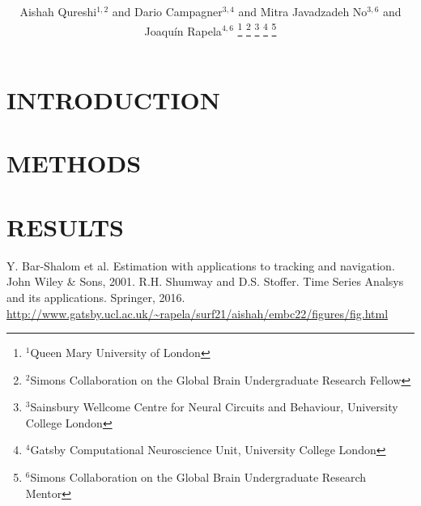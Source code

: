 \documentclass[letterpaper, 10 pt, conference]{ieeeconf}  %
\title{\LARGE \bf

}
\author{Aishah Qureshi$^{1,2}$ and Dario Campagner$^{3,4}$ and
Mitra Javadzadeh No$^{3,6}$ and
Joaqu\'{i}n Rapela$^{4,6}$%
\thanks{$^{1}$Queen Mary University of London}%
\thanks{$^{2}$Simons Collaboration on the Global Brain Undergraduate Research Fellow}%
\thanks{$^{3}$Sainsbury Wellcome Centre for Neural Circuits and Behaviour, University College London}%
\thanks{$^{4}$Gatsby Computational Neuroscience Unit, University College London}%
\thanks{$^{6}$Simons Collaboration on the Global Brain Undergraduate Research Mentor}%
}
\begin{document}
\maketitle
\thispagestyle{empty}
\pagestyle{empty}


\begin{abstract}



\end{abstract}



\section{INTRODUCTION}



\section{METHODS}



\section{RESULTS}



\addtolength{\textheight}{-12cm}   %








\begin{thebibliography}{99}

 Y. Bar-Shalom et al. Estimation with applications to tracking and navigation. John Wiley \& Sons, 2001.
 R.H. Shumway and D.S. Stoffer. Time Series Analsys and its applications. Springer, 2016.
 \url{http://www.gatsby.ucl.ac.uk/~rapela/surf21/aishah/embc22/figures/fig.html}
\end{thebibliography}
\end{document}
